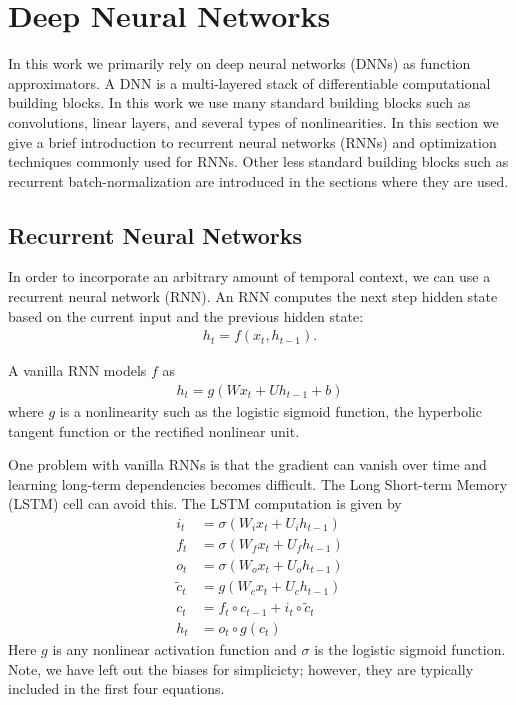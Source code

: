 \section{Deep Neural Networks}

In this work we primarily rely on deep neural networks (DNNs) as function
approximators. A DNN is a multi-layered stack of differentiable computational
building blocks. In this work we use many standard building blocks such as
convolutions, linear layers, and several types of nonlinearities. In this
section we give a brief introduction to recurrent neural networks (RNNs) and
optimization techniques commonly used for RNNs. Other less standard building
blocks such as recurrent batch-normalization are introduced in the sections
where they are used.

\subsection{Recurrent Neural Networks}

In order to incorporate an arbitrary amount of temporal context, we can use a
recurrent neural network (RNN). An RNN computes the next step hidden state
based on the current input and the previous hidden state:
\begin{align*}
h_t = f(x_t, h_{t-1}).
\end{align*}

A vanilla RNN models $f$ as
\begin{align*}
    h_t = g(W x_t + U h_{t-1} + b) 
\end{align*}
where $g$ is a nonlinearity such as the logistic sigmoid function, the
hyperbolic tangent function or the rectified nonlinear unit.

One problem with vanilla RNNs is that the gradient can vanish over time and
learning long-term dependencies becomes difficult. The Long Short-term Memory
(LSTM) cell can avoid this. The LSTM computation is given by
\begin{align*}
    i_t &= \sigma(W_i x_t + U_i h_{t-1}) \\
    f_t &= \sigma(W_f x_t + U_f h_{t-1}) \\
    o_t &= \sigma(W_o x_t + U_o h_{t-1}) \\
    \tilde{c}_t &= g(W_c x_t + U_c h_{t-1}) \\
    c_t &= f_t \circ c_{t-1} + i_t \circ \tilde{c}_t \\
    h_t &= o_t \circ g(c_t)
\end{align*}
Here $g$ is any nonlinear activation function and $\sigma$ is the logistic
sigmoid function. Note, we have left out the biases for simplicicty; however,
they are typically included in the first four equations.

